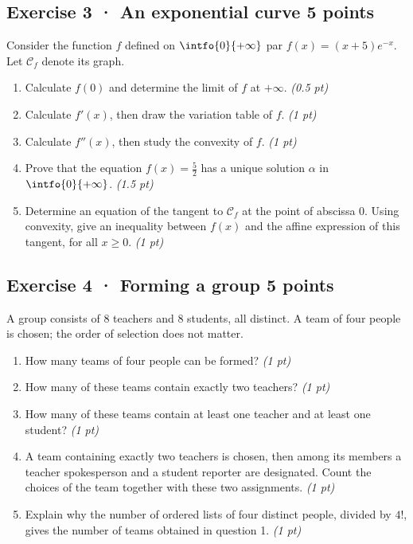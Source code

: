 \mxnewpage{}

\subsection*{Exercise 3 · An exponential curve \hfill 5 points}Consider the function $f$ defined on $\intfo{0}{+\infty}$ par $f(x)=(x+5)e^{-x}$. Let $\mathcal C_f$ denote its graph.

\begin{enumerate}

\item Calculate $f(0)$ and determine the limit of $f$ at $+\infty$. \hfill\textit{(0.5 pt)}

\item Calculate $f' (x)$, then draw the variation table of $f$. \hfill\textit{(1 pt)}

\item Calculate $f'' (x)$, then study the convexity of $f$. \hfill\textit{(1 pt)}

\item Prove that the equation $f(x)=\frac{5}{2}$ has a unique solution $\alpha$ in $\intfo{0}{+\infty}$. \hfill\textit{(1.5 pt)}

\item Determine an equation of the tangent to $\mathcal C_f$ at the point of abscissa $0$. Using convexity, give an inequality between $f(x)$ and the affine expression of this tangent, for all $x\ge0$. \hfill\textit{(1 pt)}

\end{enumerate}

\subsection*{Exercise 4 · Forming a group \hfill 5 points}A group consists of $8$ teachers and $8$ students, all distinct. A team of four people is chosen; the order of selection does not matter.

\begin{enumerate}

\item How many teams of four people can be formed? \hfill\textit{(1 pt)}

\item How many of these teams contain exactly two teachers? \hfill\textit{(1 pt)}

\item How many of these teams contain at least one teacher and at least one student? \hfill\textit{(1 pt)}

\item A team containing exactly two teachers is chosen, then among its members a teacher spokesperson and a student reporter are designated. Count the choices of the team together with these two assignments. \hfill\textit{(1 pt)}

\item Explain why the number of ordered lists of four distinct people, divided by $4!$, gives the number of teams obtained in question 1. \hfill\textit{(1 pt)}

\end{enumerate}

